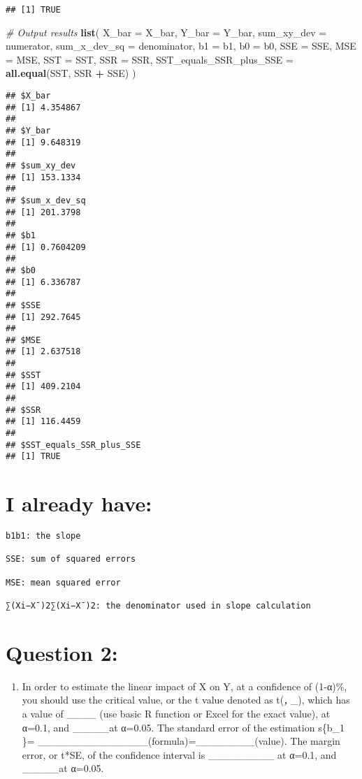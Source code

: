 \documentclass[
]{article}
\newenvironment{Shaded}{\begin{snugshade}}{\end{snugshade}}
\newcommand{\AttributeTok}[1]{\textcolor[rgb]{0.13,0.29,0.53}{#1}}
\newcommand{\CommentTok}[1]{\textcolor[rgb]{0.56,0.35,0.01}{\textit{#1}}}
\newcommand{\FunctionTok}[1]{\textcolor[rgb]{0.13,0.29,0.53}{\textbf{#1}}}
\newcommand{\NormalTok}[1]{#1}
\newcommand{\SpecialCharTok}[1]{\textcolor[rgb]{0.81,0.36,0.00}{\textbf{#1}}}
\providecommand{\tightlist}{%
  \setlength{\itemsep}{0pt}\setlength{\parskip}{0pt}}
\begin{document}
\begin{verbatim}
## [1] TRUE
\end{verbatim}

\begin{Shaded}
\begin{Highlighting}[]
\CommentTok{\# Output results}
\FunctionTok{list}\NormalTok{(}
  \AttributeTok{X\_bar =}\NormalTok{ X\_bar,}
  \AttributeTok{Y\_bar =}\NormalTok{ Y\_bar,}
  \AttributeTok{sum\_xy\_dev =}\NormalTok{ numerator,}
  \AttributeTok{sum\_x\_dev\_sq =}\NormalTok{ denominator,}
  \AttributeTok{b1 =}\NormalTok{ b1,}
  \AttributeTok{b0 =}\NormalTok{ b0,}
  \AttributeTok{SSE =}\NormalTok{ SSE,}
  \AttributeTok{MSE =}\NormalTok{ MSE,}
  \AttributeTok{SST =}\NormalTok{ SST,}
  \AttributeTok{SSR =}\NormalTok{ SSR,}
  \AttributeTok{SST\_equals\_SSR\_plus\_SSE =} \FunctionTok{all.equal}\NormalTok{(SST, SSR }\SpecialCharTok{+}\NormalTok{ SSE)}
\NormalTok{)}
\end{Highlighting}
\end{Shaded}

\begin{verbatim}
## $X_bar
## [1] 4.354867
## 
## $Y_bar
## [1] 9.648319
## 
## $sum_xy_dev
## [1] 153.1334
## 
## $sum_x_dev_sq
## [1] 201.3798
## 
## $b1
## [1] 0.7604209
## 
## $b0
## [1] 6.336787
## 
## $SSE
## [1] 292.7645
## 
## $MSE
## [1] 2.637518
## 
## $SST
## [1] 409.2104
## 
## $SSR
## [1] 116.4459
## 
## $SST_equals_SSR_plus_SSE
## [1] TRUE
\end{verbatim}

\section{I already have:}\label{i-already-have}

\begin{verbatim}
b1b1​: the slope

SSE: sum of squared errors

MSE: mean squared error

∑(Xi−Xˉ)2∑(Xi​−Xˉ)2: the denominator used in slope calculation
\end{verbatim}

\section{Question 2:}\label{question-2}

\begin{enumerate}
\def\labelenumi{(\arabic{enumi})}
\setcounter{enumi}{7}
\tightlist
\item
  In order to estimate the linear impact of X on Y, at a confidence of
  (1-α)\%, you should use the critical value, or the t value denoted as
  t(\textbf{\emph{, }}\_), which has a value of \_\_\_\_ (use basic R
  function or Excel for the exact value), at α=0.1, and \_\_\_\_\_at
  α=0.05. The standard error of the estimation s\{b\_1 \}=
  \_\_\_\_\_\_\_\_\_\_\_\_\_\_\_(formula)=\_\_\_\_\_\_\_\_(value). The
  margin error, or t*SE, of the confidence interval is
  \_\_\_\_\_\_\_\_\_ at α=0.1, and \_\_\_\_\_at α=0.05.
\end{enumerate}
\end{document}
